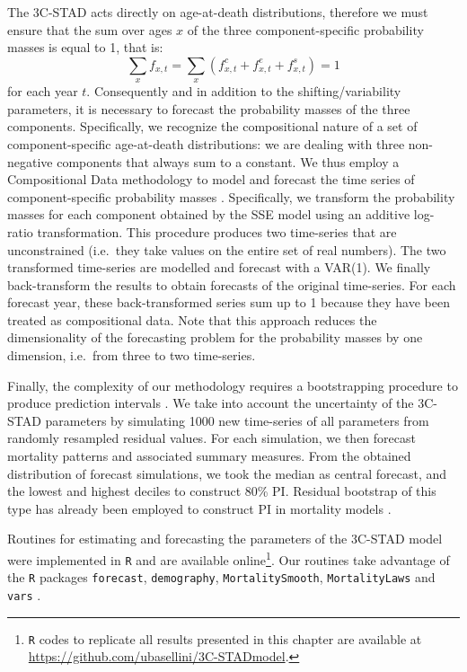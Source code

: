 \documentclass[Thesis]{subfiles}
\begin{document}
The 3C-STAD acts directly on age-at-death distributions, therefore we must ensure that the sum over ages $x$ of the three component-specific probability masses is equal to 1, that is:
%
\begin{equation}\label{Eq:Masses}
\sum_{x} f_{x,t} = \sum_{x} \left( f^{c}_{x,t}+f^{e}_{x,t}+f^{s}_{x,t}  \right) = 1
\end{equation}
% 
for each year $t$. Consequently and in addition to the shifting/variability parameters, it is necessary to forecast the probability masses of the three components. Specifically, we recognize the compositional nature of a set of component-specific age-at-death distributions: we are dealing with three non-negative components that always sum to a constant. We thus employ a Compositional Data methodology to model and forecast the time series of component-specific probability masses \citep{aitchison1986statistical, CoDa2011}. Specifically, we transform the probability masses for each component obtained by the SSE model using an additive log-ratio transformation. This procedure produces two time-series that are unconstrained (i.e.~they take values on the entire set of real numbers). The two transformed time-series are modelled and forecast with a VAR(1). We finally back-transform the results to obtain forecasts of the original time-series. For each forecast year, these back-transformed series sum up to 1 because they have been treated as compositional data. Note that this approach reduces the dimensionality of the forecasting problem for the probability masses by one dimension, i.e.~from three to two time-series.

Finally, the complexity of our methodology requires a bootstrapping procedure to produce prediction intervals \citep[PI,][]{efron1994introduction}. We take into account the uncertainty of the 3C-STAD parameters by simulating 1000 new time-series of all parameters from randomly resampled residual values. For each simulation, we then forecast mortality patterns and associated summary measures. From the obtained distribution of forecast simulations, we took the median as central forecast, and the lowest and highest deciles to construct 80\% PI. Residual bootstrap of this type has already been employed to construct PI in mortality models \citep{bergeron2017coherent, basellini2019modelling}.

Routines for estimating and forecasting the parameters of the 3C-STAD model were implemented in \texttt{R} \citep{Rcite} and are available online\footnote{\texttt{R} codes to replicate all results presented in this chapter are available at \url{https://github.com/ubasellini/3C-STADmodel}.}. Our routines take advantage of the \texttt{R} packages \texttt{forecast}, \texttt{demography}, \texttt{MortalitySmooth}, \texttt{MortalityLaws} and \texttt{vars} \citep{pfaff2008analysis,pfaff2008var,hyndman2008automatic,camarda2012mortalitysmooth,hyndman2018forecastR,demogRpackage,pascariu2018mortalitylaws}.  
\end{document}
